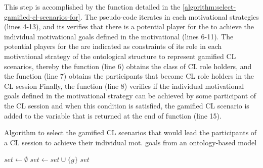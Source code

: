 This step is accomplished by the function  detailed in the \autoref{algorithm:select-gamified-cl-scenarios-for}. The pseudo-code iterates in each motivational strategies  (lines 4-13), and its verifies that there is a potential player  for the  to achieve the individual motivational goals defined in the motivational   (lines 6-11).
The potential players for the  are indicated as constraints of its role in each motivational strategy of the ontological structure to represent gamified CL scenarios, thereby the function  (line 6) obtains the class of CL role holders, and the function  (line 7) obtains the participants that become CL role holders in the CL session 
Finally, the function  (line 8) verifies if the individual motivational goals defined in the motivational strategy  can be achieved by some participant  of the CL session  and when this condition is satisfied, the gamified CL scenario  is added to the variable  that is returned at the end of function (line 15).

\begin{algoritmo}
\caption{Algorithm to select the gamified CL scenarios that would lead the participants of a CL session  to achieve their individual mot. goals from an ontology-based model }
\label{algorithm:select-gamified-cl-scenarios-for}
\begin{algorithmic}[1]\small
{}
  \State $set \gets \emptyset$
              $set \gets set \cup \{g\}$
            \EndIf
          \EndFor
        \EndFor
      \EndFor
    \EndFor
  \EndFor
  \State \Return $set$
\EndFunction
\end{algorithmic}
\end{algoritmo}

